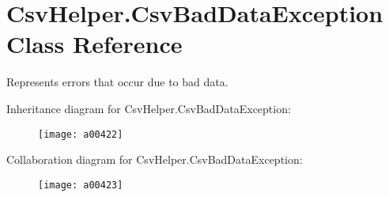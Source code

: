 \hypertarget{a00061}{\section{Csv\-Helper.\-Csv\-Bad\-Data\-Exception Class Reference}
\label{a00061}
}


Represents errors that occur due to bad data.  




Inheritance diagram for Csv\-Helper.\-Csv\-Bad\-Data\-Exception\-:
\nopagebreak
\begin{figure}[H]
\begin{center}
\leavevmode
\texttt{[image: a00422]}
\end{center}
\end{figure}


Collaboration diagram for Csv\-Helper.\-Csv\-Bad\-Data\-Exception\-:
\nopagebreak
\begin{figure}[H]
\begin{center}
\leavevmode
\texttt{[image: a00423]}
\end{center}
\end{figure}

